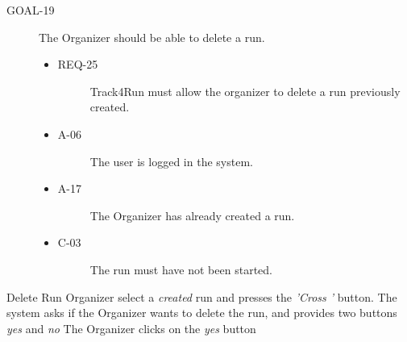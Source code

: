 \documentclass[a4paper]{article}
\newcommand{\requirement}{\ding{229}}%
\begin{document}
        \begin{description}
        	\item[GOAL-19] The Organizer should be able to delete a run.
            	\begin{itemize}
            	    \item[\requirement]
                	\begin{description}
                	\item[REQ-25] Track4Run must allow the organizer to delete a run previously created.
                	\end{description}
                	\item
                	\begin{description}
                	\item[A-06] The user is logged in the system.
                	\end{description}
                	\item
                	\begin{description}
                	\item[A-17] The Organizer has already created a run.
                	\end{description}
                	\item
                	\begin{description}
                	\item[C-03] The run must have not been started.
                	\end{description}
                	\end{itemize}
        \end{description}
        
        \begin{usecase}{Delete Run}
              {Organizer select a \textit{created} run and presses the \textit{'Cross '} button.}
              {The system asks if the Organizer wants to delete the run, and provides two buttons \textit{yes} and \textit{no}}
              {The Organizer clicks on the \textit{yes} button}
        \end{usecase}
        
\end{document}
